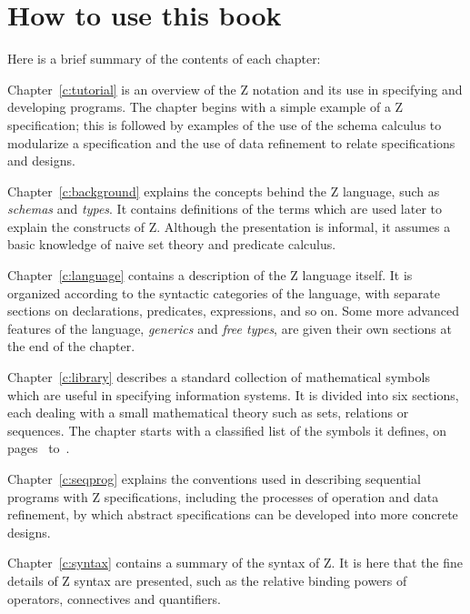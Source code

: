 \section*{How to use this book}

Here is a brief summary of the contents of each chapter:

Chapter~\ref{c:tutorial} is an overview of the Z notation and its use
in specifying and developing programs. The chapter begins with a
simple example of a Z specification; this is followed by examples of
the use of the schema calculus to modularize a specification and the
use of data refinement to relate specifications and designs.

Chapter~\ref{c:background} explains the concepts behind the Z
language, such as {\em schemas\/} and {\em types}. It contains
definitions of the terms which are used later to explain the
constructs of Z. Although the presentation is informal, it assumes a
basic knowledge of naive set theory and predicate calculus.

Chapter~\ref{c:language} contains a description of the Z language
itself. It is organized according to the syntactic categories of the
language, with separate sections on declarations, predicates,
expressions, and so on.  Some more advanced features of the language,
{\em generics\/} and {\em free types}, are given their own sections at
the end of the chapter.

Chapter~\ref{c:library} describes a standard collection of
mathematical symbols which are useful in specifying information
systems.  It is divided into six sections, each dealing with a small
mathematical theory such as sets, relations or sequences.  The chapter
starts with a classified list of the symbols it defines, on
pages~\pageref{p:symlist+} to~\pageref{p:symlist-}.

Chapter~\ref{c:seqprog} explains the conventions used in describing
sequential programs with Z specifications, including the processes of
operation and data refinement, by which abstract specifications can be
developed into more concrete designs.

Chapter~\ref{c:syntax} contains a summary of the syntax of Z. It is
here that the fine details of Z syntax are presented, such as the
relative binding powers of operators, connectives and quantifiers.

